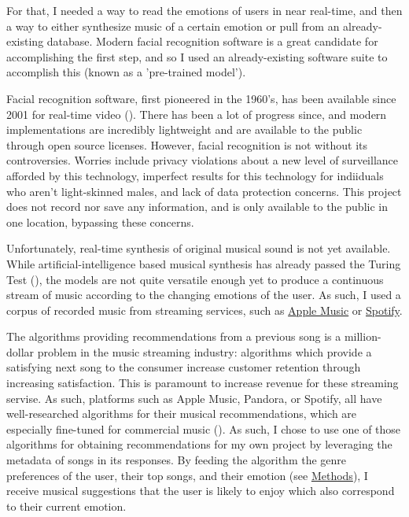 \documentclass{article}
\renewcommand{\_}[1]{\underline{ #1 }}
\theoremstyle{definition}
\begin{document}
For that, I needed a way to read the emotions of users in near real-time, and then a way to either synthesize music of a certain emotion or pull from an already-existing database. Modern facial recognition software is a great candidate for accomplishing the first step, and so I used an already-existing software suite to accomplish this (known as a 'pre-trained model').

Facial recognition software, first pioneered in the 1960's, has been available since 2001 for real-time video (\cite{yamaguchi2012}). There has been a lot of progress since, and modern implementations are incredibly lightweight and are available to the public through open source licenses. However, facial recognition is not without its controversies. Worries include privacy violations about a new level of surveillance afforded by this technology, imperfect results for this technology for indiiduals who aren't light-skinned males, and lack of data protection concerns. This project does not record nor save any information, and is only available to the public in one location, bypassing these concerns. 

Unfortunately, real-time synthesis of original musical sound is not yet available. While artificial-intelligence based musical synthesis has already passed the Turing Test (\cite{ailabs2018}), the models are not quite versatile enough yet to produce a continuous stream of music according to the changing emotions of the user. As such, I used a corpus of recorded music from streaming services, such as \href{https://www.apple.com/apple-music/}{Apple Music} or \href{https://www.spotify.com/us/}{Spotify}.

The algorithms providing recommendations from a previous song is a million-dollar problem in the music streaming industry: algorithms which provide a satisfying next song to the consumer increase customer retention through increasing satisfaction. This is paramount to increase revenue for these streaming servise. As such, platforms such as Apple Music, Pandora, or Spotify, all have well-researched algorithms for their musical recommendations, which are especially fine-tuned for commercial music (\cite{drott2018}). As such, I chose to use one of those algorithms for obtaining recommendations for my own project by leveraging the metadata of songs in its responses. By feeding the algorithm the genre preferences of the user, their top songs, and their emotion (see \hyperref[Methods]{Methods}), I receive musical suggestions that the user is likely to enjoy which also correspond to their current emotion.
\end{document}
